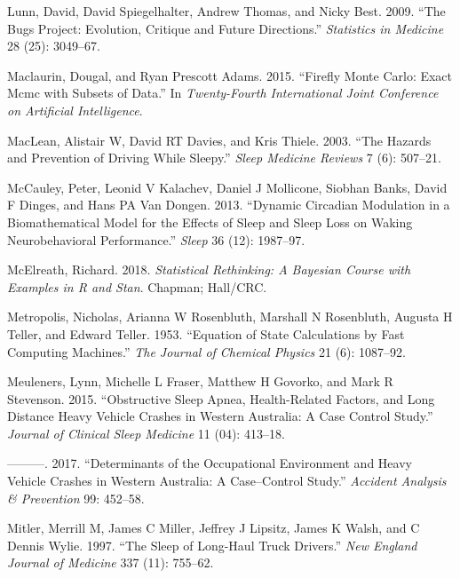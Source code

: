 \documentclass[12pt]{book}
\numberwithin{equation}{chapter}
\begin{document}
\leavevmode\hypertarget{ref-lunn2009bugs}{}%
Lunn, David, David Spiegelhalter, Andrew Thomas, and Nicky Best. 2009. ``The Bugs Project: Evolution, Critique and Future Directions.'' \emph{Statistics in Medicine} 28 (25): 3049--67.

\leavevmode\hypertarget{ref-maclaurin2015firefly}{}%
Maclaurin, Dougal, and Ryan Prescott Adams. 2015. ``Firefly Monte Carlo: Exact Mcmc with Subsets of Data.'' In \emph{Twenty-Fourth International Joint Conference on Artificial Intelligence}.

\leavevmode\hypertarget{ref-maclean2003hazards}{}%
MacLean, Alistair W, David RT Davies, and Kris Thiele. 2003. ``The Hazards and Prevention of Driving While Sleepy.'' \emph{Sleep Medicine Reviews} 7 (6): 507--21.

\leavevmode\hypertarget{ref-mccauley2013dynamic}{}%
McCauley, Peter, Leonid V Kalachev, Daniel J Mollicone, Siobhan Banks, David F Dinges, and Hans PA Van Dongen. 2013. ``Dynamic Circadian Modulation in a Biomathematical Model for the Effects of Sleep and Sleep Loss on Waking Neurobehavioral Performance.'' \emph{Sleep} 36 (12): 1987--97.

\leavevmode\hypertarget{ref-mcelreath2018statistical}{}%
McElreath, Richard. 2018. \emph{Statistical Rethinking: A Bayesian Course with Examples in R and Stan}. Chapman; Hall/CRC.

\leavevmode\hypertarget{ref-metropolis1953equation}{}%
Metropolis, Nicholas, Arianna W Rosenbluth, Marshall N Rosenbluth, Augusta H Teller, and Edward Teller. 1953. ``Equation of State Calculations by Fast Computing Machines.'' \emph{The Journal of Chemical Physics} 21 (6): 1087--92.

\leavevmode\hypertarget{ref-meuleners2015obstructive}{}%
Meuleners, Lynn, Michelle L Fraser, Matthew H Govorko, and Mark R Stevenson. 2015. ``Obstructive Sleep Apnea, Health-Related Factors, and Long Distance Heavy Vehicle Crashes in Western Australia: A Case Control Study.'' \emph{Journal of Clinical Sleep Medicine} 11 (04): 413--18.

\leavevmode\hypertarget{ref-meuleners2017determinants}{}%
---------. 2017. ``Determinants of the Occupational Environment and Heavy Vehicle Crashes in Western Australia: A Case--Control Study.'' \emph{Accident Analysis \& Prevention} 99: 452--58.

\leavevmode\hypertarget{ref-mitler1997sleep}{}%
Mitler, Merrill M, James C Miller, Jeffrey J Lipsitz, James K Walsh, and C Dennis Wylie. 1997. ``The Sleep of Long-Haul Truck Drivers.'' \emph{New England Journal of Medicine} 337 (11): 755--62.
\end{document}

